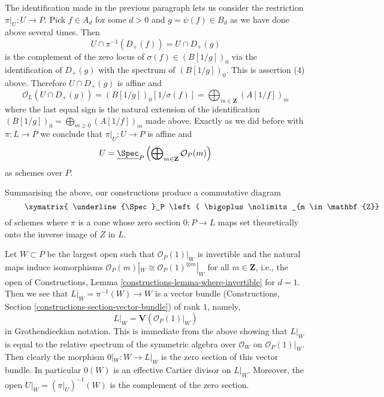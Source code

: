 \medskip\noindent
The identification made in the previous paragraph lets us
consider the restriction $\pi|_U : U \to P$. Pick 
$f \in A_d$ for some $d > 0$ and $g = \psi(f) \in B_d$
as we have done above several times. Then
$$
U \cap \pi^{-1}(D_+(f)) = U \cap D_+(g)
$$
is the complement of the zero locus of $\sigma(f) \in (B[1/g])_0$
via the identification of $D_+(g)$ with the spectrum of $(B[1/g])_0$.
This is assertion (4) above. Therefore
$U \cap D_+(g)$ is affine and
$$
\mathcal{O}_L(U \cap D_+(g)) = (B[1/g])_0[1/\sigma(f)] =
\bigoplus\nolimits_{m \in \mathbf{Z}} (A[1/f])_m
$$
where the last equal sign is the natural extension of
the identification $(B[1/g])_0 = \bigoplus_{m \geq 0} (A[1/f])_m$
made above. Exactly as we did before with $\pi : L \to P$
we conclude that $\pi|_U : U \to P$ is affine and
$$
U = \underline{\Spec}_P
\left(
\bigoplus\nolimits_{m \in \mathbf{Z}} \mathcal{O}_P(m)
\right)
$$
as schemes over $P$.

\medskip\noindent
Summarising the above, our constructions produce a commutative diagram
\begin{equation}
\label{equation-proj-and-spec}
\vcenter{
\xymatrix{
\underline{\Spec}_P \left(
\bigoplus\nolimits_{m \in \mathbf{Z}} \mathcal{O}_P(m)
\right)
\ar[r] \ar@{=}[d] &
L =
\underline{\Spec}_P \left(
\bigoplus\nolimits_{m \geq 0} \mathcal{O}_P(m)
\right) \ar[d]^\sigma \ar[r]_-\pi & P \ar[d] \\
U \ar[r] & X \ar[r] & Z
}
}
\end{equation}
of schemes where $\pi$ is a cone whose zero section $0 : P \to L$
maps set theoretically onto the inverse image of $Z$ in $L$.

\medskip\noindent
Let $W \subset P$ be the largest open such that $\mathcal{O}_P(1)|_W$
is invertible and the natural maps induce isomorphisms
$\mathcal{O}_P(m)|_W \cong \mathcal{O}_P(1)^{\otimes m}|_W$
for all $m \in \mathbf{Z}$, i.e., the open of
Constructions, Lemma \ref{constructions-lemma-where-invertible} for $d = 1$.
Then we see that $L|_W = \pi^{-1}(W) \to W$ is a vector bundle
(Constructions, Section \ref{constructions-section-vector-bundle})
of rank $1$, namely,
$$
L|_W = \mathbf{V}(\mathcal{O}_P(1)|_W)
$$
in Grothendieckian notation. This is immediate from the above showing
that $L|_W$ is equal to the relative spectrum of the symmetric algebra over
$\mathcal{O}_W$ on $\mathcal{O}_P(1)|_W$. Then clearly the
morphism $0|_W : W \to L|_W$ is the zero section of this
vector bundle. In particular $0(W)$ is an effective Cartier divisor
on $L|_W$. Moreover, the open $U|_W = (\pi|_U)^{-1}(W)$
is the complement of the zero section.

